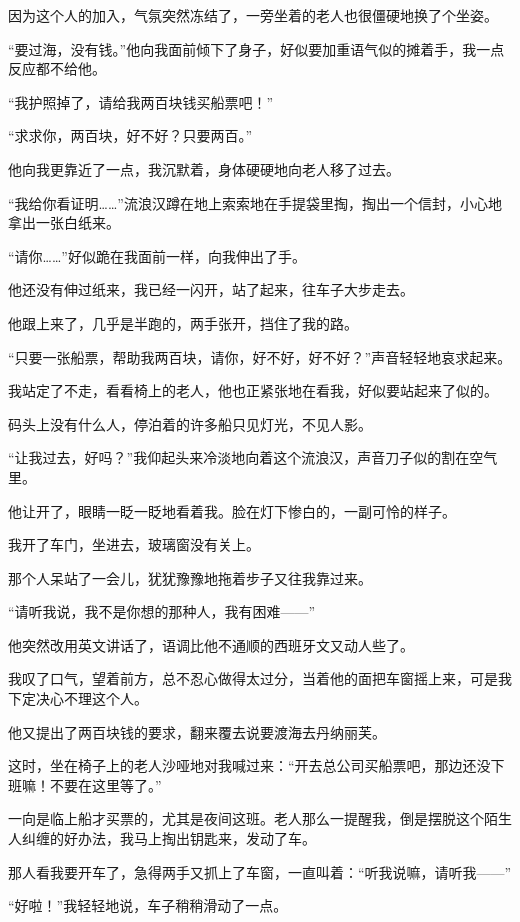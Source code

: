 \par 因为这个人的加入，气氛突然冻结了，一旁坐着的老人也很僵硬地换了个坐姿。
\par “要过海，没有钱。”他向我面前倾下了身子，好似要加重语气似的摊着手，我一点反应都不给他。
\par “我护照掉了，请给我两百块钱买船票吧！”
\par “求求你，两百块，好不好？只要两百。”
\par 他向我更靠近了一点，我沉默着，身体硬硬地向老人移了过去。
\par “我给你看证明……”流浪汉蹲在地上索索地在手提袋里掏，掏出一个信封，小心地拿出一张白纸来。
\par “请你……”好似跪在我面前一样，向我伸出了手。
\par 他还没有伸过纸来，我已经一闪开，站了起来，往车子大步走去。
\par 他跟上来了，几乎是半跑的，两手张开，挡住了我的路。
\par “只要一张船票，帮助我两百块，请你，好不好，好不好？”声音轻轻地哀求起来。
\par 我站定了不走，看看椅上的老人，他也正紧张地在看我，好似要站起来了似的。
\par 码头上没有什么人，停泊着的许多船只见灯光，不见人影。
\par “让我过去，好吗？”我仰起头来冷淡地向着这个流浪汉，声音刀子似的割在空气里。
\par 他让开了，眼睛一眨一眨地看着我。脸在灯下惨白的，一副可怜的样子。
\par 我开了车门，坐进去，玻璃窗没有关上。
\par 那个人呆站了一会儿，犹犹豫豫地拖着步子又往我靠过来。
\par “请听我说，我不是你想的那种人，我有困难——”
\par 他突然改用英文讲话了，语调比他不通顺的西班牙文又动人些了。
\par 我叹了口气，望着前方，总不忍心做得太过分，当着他的面把车窗摇上来，可是我下定决心不理这个人。
\par 他又提出了两百块钱的要求，翻来覆去说要渡海去丹纳丽芙。
\par 这时，坐在椅子上的老人沙哑地对我喊过来：“开去总公司买船票吧，那边还没下班嘛！不要在这里等了。”
\par 一向是临上船才买票的，尤其是夜间这班。老人那么一提醒我，倒是摆脱这个陌生人纠缠的好办法，我马上掏出钥匙来，发动了车。
\par 那人看我要开车了，急得两手又抓上了车窗，一直叫着：“听我说嘛，请听我——”
\par “好啦！”我轻轻地说，车子稍稍滑动了一点。
